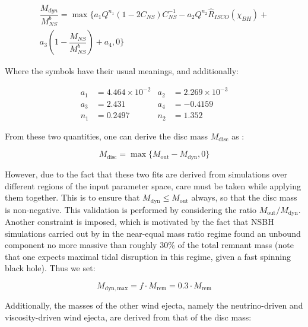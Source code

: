     \begin{multline}
        \dfrac{M_{dyn}}{M_{NS}^b} =
            \max \biggl\{
               a_1 Q^{n_1}(1 - 2C_{NS})C^{-1}_{NS} -
               a_2 Q^{n_2} \hat{R}_{ISCO}(\chi_{BH}) + \\
               a_3\left(1 - \dfrac{M_{NS}}{M^b_{NS}}\right) +
               a_4, 0
           \biggr\}
    \end{multline}

    Where the symbols have their usual meanings, and additionally:

    \begin{align*}
        a_1 &= 4.464 \times 10^{-2} & a_2 &= 2.269 \times 10^{-3} \\
        a_3 &= 2.431 & a_4 &= -0.4159 \\
        n_1 &= 0.2497 & n_2 &= 1.352
    \end{align*}

    From these two quantities, one can derive the disc mass $M_{\mathrm{disc}}$ as :

    \begin{equation}
        M_{\mathrm{disc}} = \max\{M_{\mathrm{out}} - M_{\mathrm{dyn}}, 0\}
        \label{eq:disc_mass}
    \end{equation}

    However, due to the fact that these two fits are derived from simulations over
    different regions of the input parameter space, care must be taken while applying
    them together. This is to ensure that $M_{\mathrm{dyn}} \leq M_{\mathrm{out}}$
    always, so that the disc mass is non-negative. This validation is performed by
    considering the ratio $M_{\mathrm{out}} / M_{\mathrm{dyn}}$. Another constraint is
    imposed, which is motivated by the fact that NSBH simulations carried out by
    \cite{foucart_2019} in the near-equal mass ratio regime found an unbound component
    no more massive than roughly 30\% of the total remnant mass (note that one expects
    maximal tidal disruption in this regime, given a fast spinning black hole). Thus we
    set:

    \begin{equation}
        \label{eq:constraint}
        M_{\mathrm{dyn, max}} = f \cdot M_{\mathrm{rem}} = 0.3 \cdot M_{\mathrm{rem}}
    \end{equation}


    Additionally, the masses of the other wind ejecta, namely the neutrino-driven and
    viscosity-driven wind ejecta, are derived from that of the disc mass:

